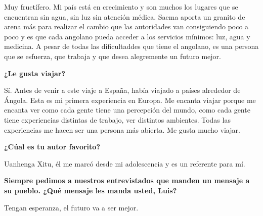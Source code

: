 \vspace{10pt}

Muy fructífero. Mi país está en crecimiento y son muchos los lugares
que se encuentran sin agua, sin luz sin atención médica. Saema
aporta un granito de arena más para realizar el cambio que las
autoridades van consiguiendo poco a poco y es que cada angolano pueda
acceder a los servicios mínimos: luz, agua y medicina. A pesar de
todas las dificultaddes que tiene el angolano, es una persona que se
esfuerza, que trabaja y que desea alegremente un futuro mejor.
\vspace{10pt}

{\bf ¿Le gusta viajar?}

\vspace{10pt}

Sí. Antes de venir a este viaje a España,  había viajado a países
alrededor de Ángola. Esta es mi primera experiencia en Europa. Me
encanta viajar porque me encanta ver como cada gente tiene una
percepción del mundo, como cada gente tiene experiencias distintas de
trabajo, ver distintos ambientes. Todas las experiencias me hacen ser una
persona más abierta. Me gusta mucho viajar.

\vspace{10pt}

{\bf ¿Cúal es tu autor favorito?}

\vspace{10pt}

Uanhenga Xitu, él me marcó desde mi adolescencia y es un referente para mí.

\vspace{10pt}

{\bf Siempre pedimos a nuestros entrevistados que manden un
  mensaje a su pueblo. ¿Qué mensaje les manda usted, Luis?}

\vspace{10pt}

Tengan esperanza, el futuro va a ser mejor. 


\vspace{10pt}

